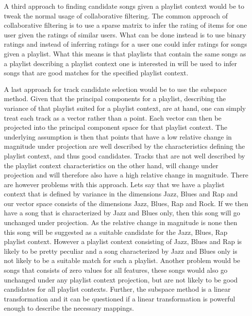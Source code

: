 \documentclass[a4paper,11pt]{kth-mag}
\begin{document}
A third approach to finding candidate songs given a playlist context would be to tweak the normal usage of collaborative filtering. The common approach of collaborative filtering is to use a sparse matrix to infer the rating of items for one user given the ratings of similar users. What can be done instead is to use binary ratings and instead of inferring ratings for a user one could infer ratings for songs given a playlist. What this means is that playlists that contain the same songs as a playlist describing a playlist context one is interested in will be used to infer songs that are good matches for the specified playlist context. 

A last approach for track candidate selection would be to use the subspace method. Given that the principal components for a playlist, describing the variance of that playlist suited for a playlist context, are at hand, one can simply treat each track as a vector rather than a point. Each vector can then be projected into the principal component space for that playlist context. The underlying assumption is then that points that have a low relative change in magnitude under projection are well described by the characteristics defining the playlist context, and thus good candidates. Tracks that are not well described by the playlist context characteristics on the other hand, will change under projection and will therefore also have a high relative change in magnitude. There are however problems with this approach. Lets say that we have a playlist context that is defined by variance in the dimensions Jazz, Blues and Rap and our vector space consists of the dimensions Jazz, Blues, Rap and Rock. If we then have a song that is characterized by Jazz and Blues only, then this song will go unchanged under projection. As the relative change in magnitude is none then this song will be suggested as a suitable candidate for the Jazz, Blues, Rap playlist context. However a playlist context consisting of Jazz, Blues and Rap is likely to be pretty peculiar and a song characterized by Jazz and Blues only is not likely to be a suitable match for such a playlist. Another problem would be songs that consists of zero values for all features, these songs would also go unchanged under any playlist context projection, but are not likely to be good candidates for all playlist contexts. Further, the subspace method is a linear transformation and it can be questioned if a linear transformation is powerful enough to describe the necessary mappings.
\end{document}
